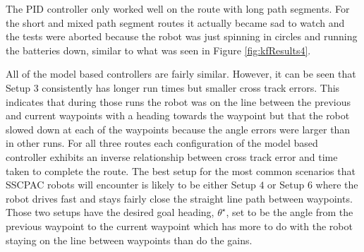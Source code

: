 The PID controller only worked well on the route with long path segments. For the short and mixed path segment routes it actually became sad to watch and the tests were aborted because the robot was just spinning in circles and running the batteries down, similar to what was seen in Figure \ref{fig:kfResults4}.

All of the model based controllers are fairly similar. However, it can be seen that Setup $3$ consistently has longer run times but smaller cross track errors. This indicates that during those runs the robot was on the line between the previous and current waypoints with a heading towards the waypoint but that the robot slowed down at each of the waypoints because the angle errors were larger than in other runs. For all three routes each configuration of the model based controller exhibits an inverse relationship between cross track error and time taken to complete the route. The best setup for the most common scenarios that SSCPAC robots will encounter is likely to be either Setup $4$ or Setup $6$ where the robot drives fast and stays fairly close the straight line path between waypoints. Those two setups have the desired goal heading, $\theta^\star$, set to be the angle from the previous waypoint to the current waypoint which has more to do with the robot staying on the line between waypoints than do the gains.
